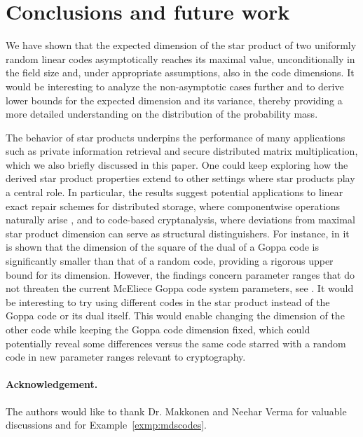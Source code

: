 \documentclass[a4paper,11pt,reqno]{article}
\theoremstyle{plain} \numberwithin{equation}{section}
\theoremstyle{definition}
\begin{document}
\section{Conclusions and future work}



We have shown that the expected dimension of the star product of two uniformly random linear codes asymptotically reaches its maximal value, unconditionally in the field size and, under appropriate assumptions, also in the code dimensions. It would be interesting to analyze the non-asymptotic cases further and to derive lower bounds for the expected dimension and its variance, thereby providing a more detailed understanding on the distribution of the probability mass. 

The behavior of star products underpins the performance of many applications such as private information retrieval and secure distributed matrix multiplication, which we also briefly discussed in this paper. One could keep exploring how the derived star product properties extend to other settings where star products play a central role. In particular, the results suggest potential applications to linear exact repair schemes for distributed storage, where componentwise operations naturally arise \cite{guruswamiwooters,matthewsrepair}, and to code-based cryptanalysis, where deviations from maximal star product dimension can serve as structural distinguishers. For instance, in \cite{Mora2022dual} it is shown that the dimension of the square of the dual of a Goppa code is significantly smaller than that of a random code, providing a rigorous upper bound for its dimension. However, the findings concern parameter ranges that do not threaten the current  McEliece Goppa code system parameters, see \cite[Table 1]{Mora2022dual}. It would be interesting to try using different codes in the star product instead of the Goppa code or its dual itself. This would enable changing the dimension of the other code while keeping the Goppa code dimension fixed, which could potentially reveal some differences versus the same code starred with a random code in new parameter ranges relevant to cryptography.

\paragraph*{Acknowledgement.} The authors would like to thank Dr. 
Makkonen and Neehar Verma for valuable discussions and for Example~\ref{exmp:mdscodes}.




\end{document}
